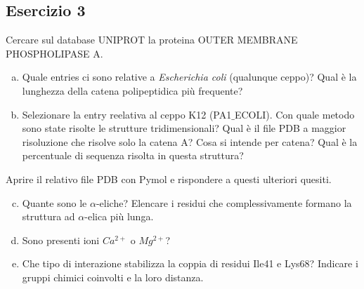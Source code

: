 \documentclass{article}
\begin{document}
\subsection*{Esercizio 3}
Cercare sul database UNIPROT la proteina OUTER MEMBRANE PHOSPHOLIPASE A.
\begin{enumerate}[a)]
   \item Quale entries ci sono relative a \textit{Escherichia coli} (qualunque ceppo)? Qual è la lunghezza della catena polipeptidica più frequente?
   \item Selezionare la entry reelativa al ceppo K12 (PA1$\_$ECOLI). Con quale metodo sono state risolte le strutture tridimensionali? Qual è il file PDB a maggior risoluzione che risolve solo la catena A? Cosa si intende per catena? Qual è la percentuale di sequenza risolta in questa struttura?
\end{enumerate}
Aprire il relativo file PDB con Pymol e rispondere a questi ulteriori quesiti.
\begin{enumerate}[a)]
   \setcounter{enumi}{2}
   \item Quante sono le $\alpha$-eliche? Elencare i residui che complessivamente formano la struttura ad $\alpha$-elica più lunga.
   \item Sono presenti ioni $Ca^{2+}$ o $Mg^{2+}$?
   \item Che tipo di interazione stabilizza la coppia di residui Ile41 e Lys68? Indicare i gruppi chimici coinvolti e la loro distanza.
\end{enumerate}
\end{document}
